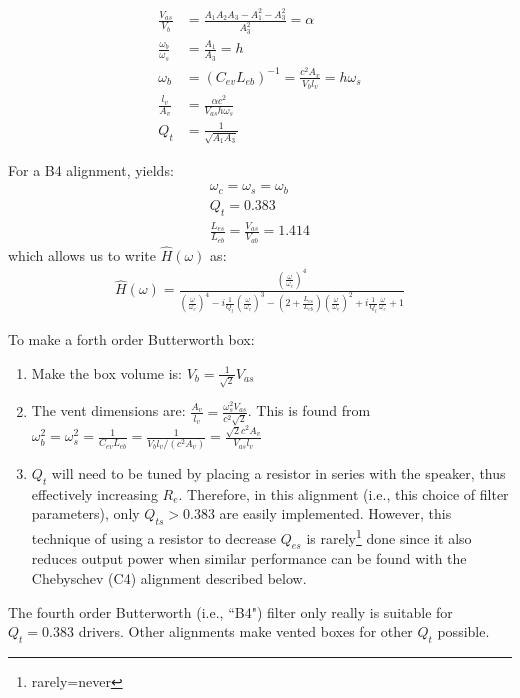 \documentclass[10pt]{book}
\begin{document}
\begin{align}
\frac{V_{as}}{V_{b}}&=\frac{A_1A_2A_3-A_1^2-A_3^2}{A_3^2}=\alpha\label{eq:dimensions-start}\\
\frac{\omega_b}{\omega_s}&=\frac{A_1}{A_3}=h\\
\omega_b&=(C_{ev}L_{eb})^{-1}=\frac{c^2A_v}{V_bl_v}=h\omega_s\\
\frac{l_v}{A_v}&=\frac{\alpha c^2}{V_{as} h \omega_s}\\
Q_t&=\frac{1}{\sqrt{A_1A_3}}\label{eq:dimensions-end}
\end{align}

For a B4 alignment, yields:
\begin{align}
\omega_c=\omega_s=\omega_b\\
Q_t=0.383\\
\frac{L_{es}}{L_{eb}}=\frac{V_{as}}{V_{ab}}=1.414
\end{align}
which allows us to write $\hat{H}(\omega)$ as:
\begin{align}
\hat{H}(\omega)=\frac{\left(\frac{\omega}{\omega_c}\right)^4}
{\left(\frac{\omega}{\omega_c}\right)^4-i\frac{1}{Q_t}\left(\frac{\omega}{\omega_c}\right)^3-\left(2+\frac{L_{es}}{L_{eb}}\right)\left(\frac{\omega}{\omega_c}\right)^2+i\frac{1}{Q_t}\frac{\omega}{\omega_c}+1}
\end{align}

To make a forth order Butterworth box:
\begin{enumerate}
\item Make the box volume is: $V_b=\frac{1}{\sqrt{2}}V_{as}$
\item The vent dimensions are: $\frac{A_v}{l_v}=\frac{\omega_s^2 V_{as}}{c^2\sqrt{2}}$. This is found from $\omega_b^2=\omega_s^2=\frac{1}{C_{ev}L_{eb}}=\frac{1}{V_b l_v/(c^2 A_v)}=\frac{\sqrt{2}c^2 A_v}{V_{as}l_v}$
\item $Q_t$ will need to be tuned by placing a resistor in series with the speaker, thus effectively increasing $R_e$. Therefore, in this alignment (i.e., this choice of filter parameters), only $Q_{ts}>0.383$ are easily implemented. However, this technique of using a resistor to decrease $Q_{es}$ is rarely\footnote{rarely=never} done since it also reduces output power when similar performance can be found with the Chebyschev (C4) alignment described below.
\end{enumerate}

The fourth order Butterworth (i.e., ``B4") filter only really is suitable for $Q_t=0.383$ drivers. Other alignments make vented boxes for other $Q_t$ possible.
\end{document}
